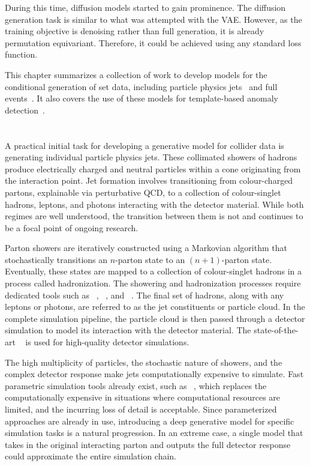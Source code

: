 During this time, diffusion models started to gain prominence.
The diffusion generation task is similar to what was attempted with the VAE.
However, as the training objective is denoising rather than full generation, it is already permutation equivariant.
Therefore, it could be achieved using any standard loss function.

This chapter summarizes a collection of work to develop models for the conditional generation of set data, including particle physics jets~\cite{PCJedi, EpicJedi, PCDroid} and full events~\cite{PIPPIN}.
It also covers the use of these models for template-based anomaly detection~\cite{Drapes, RadOT}.

\section{\pcjedi}

A practical initial task for developing a generative model for collider data is generating individual particle physics jets.
These collimated showers of hadrons produce electrically charged and neutral particles within a cone originating from the interaction point.
Jet formation involves transitioning from colour-charged partons, explainable via perturbative QCD, to a collection of colour-singlet hadrons, leptons, and photons interacting with the detector material.
While both regimes are well understood, the transition between them is not and continues to be a focal point of ongoing research.

Parton showers are iteratively constructed using a Markovian algorithm that stochastically transitions an $n$-parton state to an $(n+1)$-parton state.
Eventually, these states are mapped to a collection of colour-singlet hadrons in a process called hadronization.
The showering and hadronization processes require dedicated tools such as \pythia~\cite{Pythia8}, \sherpa~\cite{Sherpa}, and \herwig~\cite{Herwig}.
The final set of hadrons, along with any leptons or photons, are referred to as the jet constituents or particle cloud.
In the complete simulation pipeline, the particle cloud is then passed through a detector simulation to model its interaction with the detector material.
The state-of-the-art \geant~\cite{Geant4} is used for high-quality detector simulations.

The high multiplicity of particles, the stochastic nature of showers, and the complex detector response make jets computationally expensive to simulate.
Fast parametric simulation tools already exist, such as \delphes~\cite{Delphes}, which replaces the computationally expensive \geant in situations where computational resources are limited, and the incurring loss of detail is acceptable.
Since parameterized approaches are already in use, introducing a deep generative model for specific simulation tasks is a natural progression.
In an extreme case, a single model that takes in the original interacting parton and outputs the full detector response could approximate the entire simulation chain.

